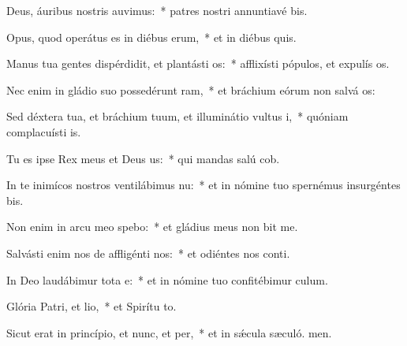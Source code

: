 \item Deus, áuribus nostris auvimus:~* patres nostri annuntiavé bis.
\item Opus, quod operátus es in diébus erum,~* et in diébus quis.
\item Manus tua gentes dispérdidit, et plantásti os:~* afflixísti pópulos, et expulís os.
\item Nec enim in gládio suo possedérunt ram,~* et bráchium eórum non salvá os:
\item Sed déxtera tua, et bráchium tuum, et illuminátio vultus i,~* quóniam complacuísti  is.
\item Tu es ipse Rex meus et Deus us:~* qui mandas salú cob.
\item In te inimícos nostros ventilábimus nu:~* et in nómine tuo spernémus insurgéntes  bis.
\item Non enim in arcu meo spebo:~* et gládius meus non bit me.
\item Salvásti enim nos de affligénti nos:~* et odiéntes nos conti.
\item In Deo laudábimur tota e:~* et in nómine tuo confitébimur  culum.
\item Glória Patri, et lio,~* et Spirítu to.
\item Sicut erat in princípio, et nunc, et per,~* et in sǽcula sæculó. men.

